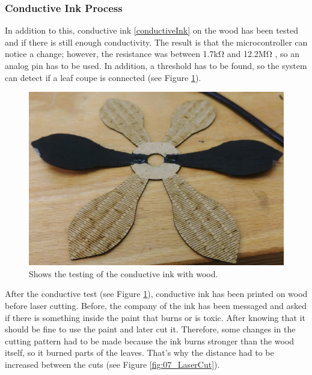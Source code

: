 \documentclass[04.3_buildingProcess.tex]{subfiles}
\begin{document}
    \subsubsection{Conductive Ink Process}
    \begin{flushleft}
        \noindent
        In addition to this, conductive ink \ref{conductiveInk} on the wood has been tested and if there is 
        still enough conductivity. The result is that the microcontroller can notice a 
        change; however, the resistance was between 1.7k\si{\ohm} and 12.2M\si{\ohm} , 
        so an analog pin has to be used. In addition, a threshold has to be found, so 
        the system can detect if a leaf coupe is connected (see Figure \ref{fig:leaveConductiveInk}).

        \begin{figure}[h!]
            \centering
            \includegraphics[scale=0.05]{images/materialProcess/leaveTesting_.jpg}
            \caption{Shows the testing of the conductive ink with wood.}
            \label{fig:leaveConductiveInk}
        \end{figure}

        \noindent
        After the conductive test (see Figure \ref{fig:leaveConductiveInk}), conductive ink has been 
        printed on wood before laser cutting. Before, the company of the ink has been messaged and asked 
        if there is something inside the paint that burns or is toxic. After knowing that it should be fine to 
        use the paint and later cut it. Therefore, some changes in the cutting pattern had to be made
        because the ink burns stronger than the wood itself, so it burned parts of the leaves. 
        That's why the distance had to be increased between the cuts (see Figure \ref{fig:07_LaserCut}). 


\end{flushleft}
\end{document}

